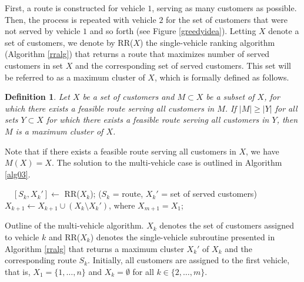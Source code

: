 \documentclass[dissertation,draft*]{aaltoseries}
\newtheorem*{definition}{Definition}
\begin{document}
First, a route is constructed for vehicle $1$, serving as many 
customers as possible. Then, the process is repeated with vehicle $2$ for the set of customers
that were not served by vehicle $1$ and so forth (see Figure \ref{greedyidea}). 
Letting $X$ denote a
set of customers, we denote by RR($X$) the single-vehicle ranking algorithm (Algorithm \ref{rralg}) that returns a route 
that maximizes number of served customers in set $X$ and the corresponding set of served customers.
This set will be referred to as a maximum cluster of $X$, which is formally defined as follows.
\begin{definition}
Let $X$ be a set of customers and $M \subset X$ be a subset of $X$, for which there exists a feasible 
route serving all customers in $M$. If $|M| \geq |Y|$ for all sets $Y \subset X$
for which there exists a feasible route serving all customers in $Y$, then $M$ is a \emph{maximum cluster} of $X$.
\end{definition}
Note that if there exists a feasible route serving all customers in $X$, we have $M(X) = X$.
The solution to the multi-vehicle case is outlined in Algorithm \ref{alg03}.

\begin{algorithm}
\begin{algorithmic}
\STATE \ \ $[S_k,X_k'] \leftarrow $ RR($X_k$); \hfill ($S_k$ = route, $X_k'$ = set of served customers)
\STATE \ \ $X_{k+1}  \leftarrow X_{k+1} \cup (X_k \setminus X_k')$, where $X_{m+1} = X_1$;
\ENDFOR
\end{algorithmic}
\caption{Outline of the multi-vehicle algorithm. $X_k$ denotes the set of customers assigned 
to vehicle $k$ and RR($X_k$) denotes the single-vehicle 
subroutine presented in Algorithm \ref{rralg} that returns
a maximum cluster $X_k'$ of $X_k$ and the corresponding route $S_k$. 
Initially, all customers are assigned to the first vehicle, that is, $X_1 = \{1,\ldots,n\}$ and $X_k = \emptyset$ for all $k \in \{2,\ldots,m\}$.}
\label{alg03}
\end{algorithm}
\end{document}
